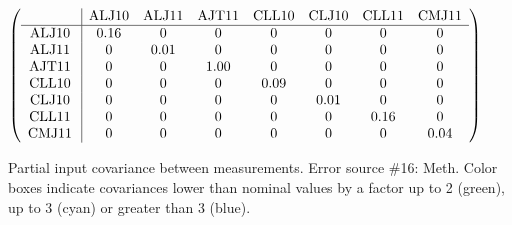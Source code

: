 \begin{table}[H]
\scriptsize
\begin{center}
\renewcommand{\arraystretch}{1.1}
\begin{math}\left(\begin{array}{c|ccccccc}
 & \mathrm{ALJ10} & 
\mathrm{ALJ11} & 
\mathrm{AJT11} & 
\mathrm{CLL10} & 
\mathrm{CLJ10} & 
\mathrm{CLL11} & 
\mathrm{CMJ11} \\
\hline
\mathrm{ALJ10} \hspace*{2pt} &       0.16 &  0 &  0 &  0 &  0 &  0 &  0 \\
\mathrm{ALJ11} \hspace*{2pt} &  0 &       0.01 &  0 &  0 &  0 &  0 &  0 \\
\mathrm{AJT11} \hspace*{2pt} &  0 &  0 &       1.00 &  0 &  0 &  0 &  0 \\
\mathrm{CLL10} \hspace*{2pt} &  0 &  0 &  0 &       0.09 &  0 &  0 &  0 \\
\mathrm{CLJ10} \hspace*{2pt} &  0 &  0 &  0 &  0 &       0.01 &  0 &  0 \\
\mathrm{CLL11} \hspace*{2pt} &  0 &  0 &  0 &  0 &  0 &       0.16 &  0 \\
\mathrm{CMJ11} \hspace*{2pt} &  0 &  0 &  0 &  0 &  0 &  0 &       0.04 \\
\end{array}\right)\end{math}
\caption{Partial input covariance between measurements. Error source \#16: Meth. Color boxes indicate covariances lower than nominal values by a factor up to 2 (green), up to 3 (cyan) or greater than 3 (blue).}
\renewcommand{\arraystretch}{1}
\end{center}
\end{table}
